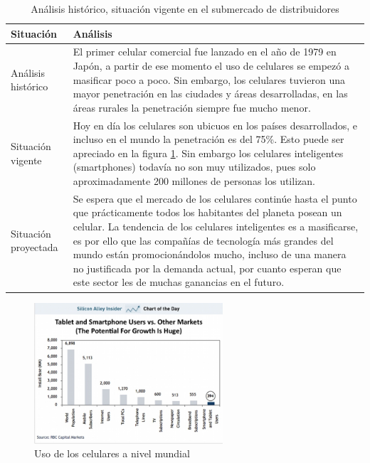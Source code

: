 \documentclass[a4paper, 12pt, oneside]{article}
\begin{document}
	\begin{table}
		\caption{Análisis histórico, situación vigente en el submercado de distribuidores}
		\begin{tabular}{ | p{4cm} | p{10cm} | }
		\hline
		Situación & Análisis \\
		\hline					
		Análisis histórico & 
		El primer celular comercial fue lanzado en el año de 1979 en Japón, a partir de ese momento el uso de celulares se empezó a masificar poco a poco. Sin embargo, los celulares tuvieron una mayor penetración en las ciudades y áreas desarrolladas, en las áreas rurales la penetración siempre fue mucho menor.
		\\
		\hline
		Situación vigente &
		Hoy en día los celulares son ubicuos en los países desarrollados, e incluso en el mundo la penetración es del 75\%. Esto puede ser apreciado en la figura \ref{fig:usocel1}.
		Sin embargo los celulares inteligentes (smartphones) todavía no son muy utilizados, pues solo aproximadamente 200 millones de personas los utilizan.
		 \\
		\hline
		Situación proyectada &
		Se espera que el mercado de los celulares continúe hasta el punto que prácticamente todos los habitantes del planeta posean un celular. La tendencia de los celulares
		inteligentes es a masificarse, es por ello que las compañías de tecnología más grandes del mundo están promocionándolos mucho, incluso de una manera no justificada
		por la demanda actual, por cuanto esperan que este sector les de muchas ganancias en el futuro.
		 \\
		\hline
		\end{tabular}
		\label{distHistorico}
	\end{table}

	\begin{figure}[htb]
	\begin{center}
	\leavevmode
	\includegraphics[width=7cm]{img/usocel1.jpg}
	\end{center}
	\caption{Uso de los celulares a nivel mundial}
	\label{fig:usocel1}
	\end{figure}
	
\end{document}
